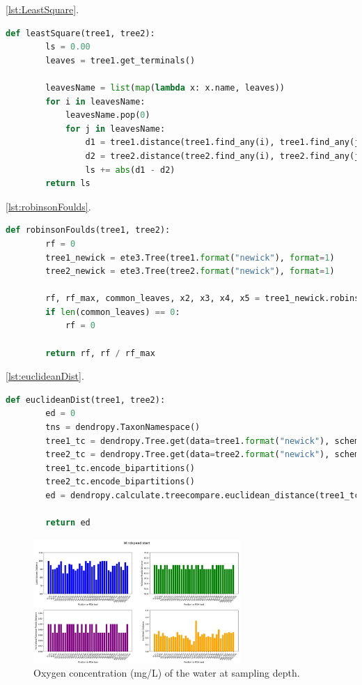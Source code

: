 \autoref{lst:LeastSquare}.
\begin{lstlisting}[label=lst:LeastSquare,language=Python,caption=aPhyloGeo’s leastSquare function]
    def leastSquare(tree1, tree2):
        ls = 0.00
        leaves = tree1.get_terminals()

        leavesName = list(map(lambda x: x.name, leaves))
        for i in leavesName:
            leavesName.pop(0)
            for j in leavesName:
                d1 = tree1.distance(tree1.find_any(i), tree1.find_any(j))
                d2 = tree2.distance(tree2.find_any(i), tree2.find_any(j))
                ls += abs(d1 - d2)
        return ls
\end{lstlisting}


\autoref{lst:robinsonFoulds}.
\begin{lstlisting}[label=lst:robinsonFoulds,language=Python,caption=aPhyloGeo’s robinsonFoulds function]
    def robinsonFoulds(tree1, tree2):
        rf = 0
        tree1_newick = ete3.Tree(tree1.format("newick"), format=1)
        tree2_newick = ete3.Tree(tree2.format("newick"), format=1)

        rf, rf_max, common_leaves, x2, x3, x4, x5 = tree1_newick.robinson_foulds(tree2_newick, unrooted_trees=True)
        if len(common_leaves) == 0:
            rf = 0

        return rf, rf / rf_max
\end{lstlisting}

\autoref{lst:euclideanDist}.
\begin{lstlisting}[label=lst:euclideanDist,language=Python,caption=aPhyloGeo’s euclideanDist function]
    def euclideanDist(tree1, tree2):
        ed = 0
        tns = dendropy.TaxonNamespace()
        tree1_tc = dendropy.Tree.get(data=tree1.format("newick"), schema="newick", taxon_namespace=tns)
        tree2_tc = dendropy.Tree.get(data=tree2.format("newick"), schema="newick", taxon_namespace=tns)
        tree1_tc.encode_bipartitions()
        tree2_tc.encode_bipartitions()
        ed = dendropy.calculate.treecompare.euclidean_distance(tree1_tc, tree2_tc)

        return ed
\end{lstlisting}

\begin{figure}[]
    \centering
    \includegraphics[width=0.7\textwidth]{figure5.png}
    \caption{Oxygen concentration (mg/L) of the water at sampling depth. \label{fig:fig5}}
\end{figure}


